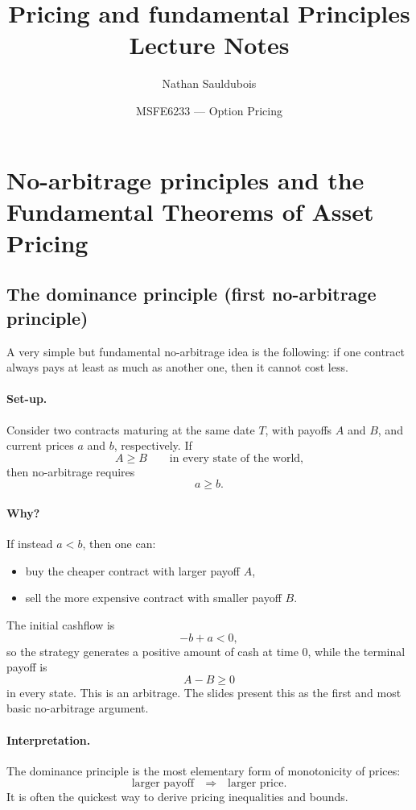 \documentclass[11pt]{article}
\title{\textbf{Pricing and fundamental Principles}\\
\large Lecture Notes}
\author{Nathan Sauldubois}
\date{MSFE6233 --- Option Pricing}
\newcommand{\1}{\mathbf{1}}
\begin{document}
\maketitle
\vspace{-1.2em}


\section{No-arbitrage principles and the Fundamental Theorems of Asset Pricing}

\subsection{The dominance principle (first no-arbitrage principle)}

A very simple but fundamental no-arbitrage idea is the following:
if one contract always pays at least as much as another one, then it cannot cost less.

\paragraph{Set-up.}
Consider two contracts maturing at the same date \(T\), with payoffs \(A\) and \(B\),
and current prices \(a\) and \(b\), respectively.
If
$$
A \ge B
\qquad \text{in every state of the world,}
$$
then no-arbitrage requires
$$
\boxed{\ a \ge b.\ }
$$

\paragraph{Why?}
If instead \(a<b\), then one can:
\begin{itemize}[leftmargin=1.4em]
    \item buy the cheaper contract with larger payoff \(A\),
    \item sell the more expensive contract with smaller payoff \(B\).
\end{itemize}
The initial cashflow is
$$
-b+a<0,
$$
so the strategy generates a positive amount of cash at time \(0\),
while the terminal payoff is
$$
A-B\ge 0
$$
in every state.
This is an arbitrage. The slides present this as the first and most basic no-arbitrage argument. 
\paragraph{Interpretation.}
The dominance principle is the most elementary form of monotonicity of prices:
$$
\text{larger payoff} \quad \Longrightarrow \quad \text{larger price.}
$$
It is often the quickest way to derive pricing inequalities and bounds.
\end{document}
